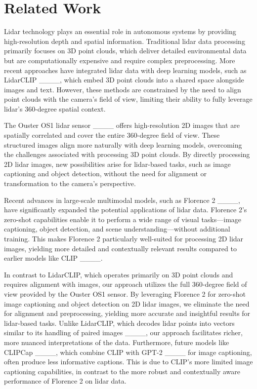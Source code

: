 \section{Related Work}
Lidar technology plays an essential role in autonomous systems by providing high-resolution depth and spatial information. Traditional lidar data processing primarily focuses on 3D point clouds, which deliver detailed environmental data but are computationally expensive and require complex preprocessing. More recent approaches have integrated lidar data with deep learning models, such as LidarCLIP ____, which embed 3D point clouds into a shared space alongside images and text. However, these methods are constrained by the need to align point clouds with the camera's field of view, limiting their ability to fully leverage lidar’s 360-degree spatial context.

The Ouster OS1 lidar sensor ____ offers high-resolution 2D images that are spatially correlated and cover the entire 360-degree field of view. These structured images align more naturally with deep learning models, overcoming the challenges associated with processing 3D point clouds. By directly processing 2D lidar images, new possibilities arise for lidar-based tasks, such as image captioning and object detection, without the need for alignment or transformation to the camera's perspective.

Recent advances in large-scale multimodal models, such as Florence 2 ____, have significantly expanded the potential applications of lidar data. Florence 2’s zero-shot capabilities enable it to perform a wide range of visual tasks—image captioning, object detection, and scene understanding—without additional training. This makes Florence 2 particularly well-suited for processing 2D lidar images, yielding more detailed and contextually relevant results compared to earlier models like CLIP ____.

In contrast to LidarCLIP, which operates primarily on 3D point clouds and requires alignment with images, our approach utilizes the full 360-degree field of view provided by the Ouster OS1 sensor. By leveraging Florence 2 for zero-shot image captioning and object detection on 2D lidar images, we eliminate the need for alignment and preprocessing, yielding more accurate and insightful results for lidar-based tasks. Unlike LidarCLIP, which decodes lidar points into vectors similar to its handling of paired images ____, our approach facilitates richer, more nuanced interpretations of the data. Furthermore, future models like CLIPCap ____, which combine CLIP with GPT-2 ____ for image captioning, often produce less informative captions. This is due to CLIP's more limited image captioning capabilities, in contrast to the more robust and contextually aware performance of Florence 2 on lidar data.

